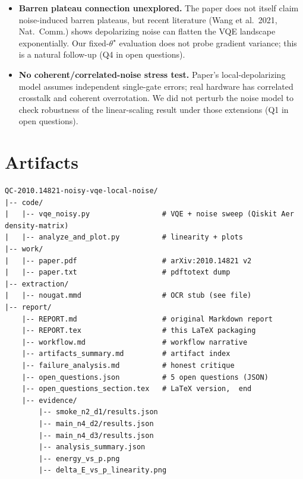 \documentclass[11pt]{article}
\begin{document}
\begin{itemize}
\item \textbf{Barren plateau connection unexplored.} The paper does not itself claim noise-induced barren
plateaus, but recent literature (Wang et al.\ 2021, Nat.\ Comm.) shows depolarizing noise can flatten
the VQE landscape exponentially. Our fixed-$\theta^\star$ evaluation does not probe gradient variance;
this is a natural follow-up (Q4 in open questions).

\item \textbf{No coherent/correlated-noise stress test.} Paper's local-depolarizing model assumes
independent single-gate errors; real hardware has correlated crosstalk and coherent overrotation. We did
not perturb the noise model to check robustness of the linear-scaling result under those extensions
(Q1 in open questions).
\end{itemize}

\section{Artifacts}
\begin{verbatim}
QC-2010.14821-noisy-vqe-local-noise/
|-- code/
|   |-- vqe_noisy.py                 # VQE + noise sweep (Qiskit Aer density-matrix)
|   |-- analyze_and_plot.py          # linearity + plots
|-- work/
|   |-- paper.pdf                    # arXiv:2010.14821 v2
|   |-- paper.txt                    # pdftotext dump
|-- extraction/
|   |-- nougat.mmd                   # OCR stub (see file)
|-- report/
    |-- REPORT.md                    # original Markdown report
    |-- REPORT.tex                   # this LaTeX packaging
    |-- workflow.md                  # workflow narrative
    |-- artifacts_summary.md         # artifact index
    |-- failure_analysis.md          # honest critique
    |-- open_questions.json          # 5 open questions (JSON)
    |-- open_questions_section.tex   # LaTeX version,  end
    |-- evidence/
        |-- smoke_n2_d1/results.json
        |-- main_n4_d2/results.json
        |-- main_n4_d3/results.json
        |-- analysis_summary.json
        |-- energy_vs_p.png
        |-- delta_E_vs_p_linearity.png
\end{verbatim}


\end{document}
